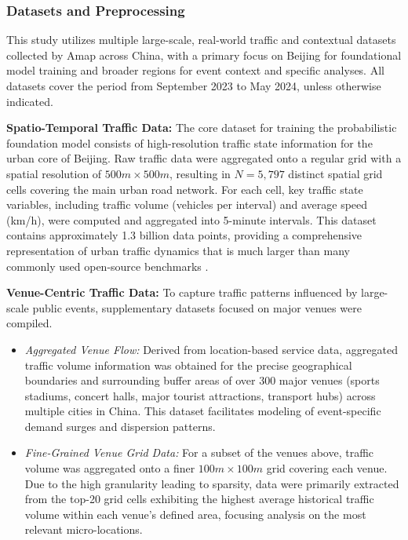 \documentclass{article}
\begin{document}
\subsubsection{Datasets and Preprocessing}
This study utilizes multiple large-scale, real-world traffic and contextual datasets collected by Amap across China, with a primary focus on Beijing for foundational model training and broader regions for event context and specific analyses. All datasets cover the period from September 2023 to May 2024, unless otherwise indicated.

\textbf{Spatio-Temporal Traffic Data:} The core dataset for training the probabilistic foundation model consists of high-resolution traffic state information for the urban core of Beijing. Raw traffic data were aggregated onto a regular grid with a spatial resolution of $500m \times 500m$, resulting in $N=5,797$ distinct spatial grid cells covering the main urban road network. For each cell, key traffic state variables, including traffic volume (vehicles per interval) and average speed (km/h), were computed and aggregated into 5-minute intervals. This dataset contains approximately 1.3 billion data points, providing a comprehensive representation of urban traffic dynamics that is much larger than many commonly used open-source benchmarks \cite{liu_largest_2023}.

\textbf{Venue-Centric Traffic Data:} To capture traffic patterns influenced by large-scale public events, supplementary datasets focused on major venues were compiled.
\begin{itemize}
    \item \textit{Aggregated Venue Flow:} Derived from location-based service data, aggregated traffic volume information was obtained for the precise geographical boundaries and surrounding buffer areas of over 300 major venues (sports stadiums, concert halls, major tourist attractions, transport hubs) across multiple cities in China. This dataset facilitates modeling of event-specific demand surges and dispersion patterns.
    \item \textit{Fine-Grained Venue Grid Data:} For a subset of the venues above, traffic volume was aggregated onto a finer $100m \times 100m$ grid covering each venue. Due to the high granularity leading to sparsity, data were primarily extracted from the top-20 grid cells exhibiting the highest average historical traffic volume within each venue's defined area, focusing analysis on the most relevant micro-locations.
\end{itemize}
\end{document}
